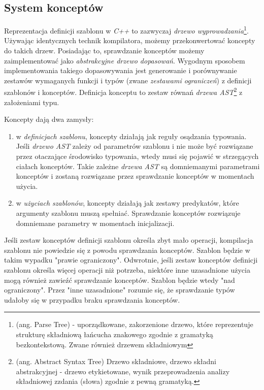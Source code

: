 \documentclass[11pt, a4paper]{article}
\begin{document}
\lstset{language=C++}

\subsection{System konceptów}

Reprezentacja definicji szablonu w \emph{C++} to zazwyczaj \emph{drzewo wyprowadzania}\footnote{(ang. Parse Tree) - uporządkowane, zakorzenione drzewo, które reprezentuje strukturę składniową łańcucha znakowego zgodnie z gramatyką bezkontekstową. Zwane również drzewem składniowym}. Używając identycznych technik kompilatora, możemy przekonwertować koncepty do takich drzew. Posiadając to, sprawdzanie konceptów możemy zaimplementować jako \emph{abstrakcyjne drzewo dopasowań}. Wygodnym sposobem implementowania takiego dopasowywania jest generowanie i porównywanie zestawów wymaganych funkcji i typów (zwane \emph{zestawami ograniczeń}) z definicji szablonów i konceptów. Definicja konceptu to zestaw równań \emph{drzewa AST}\footnote{(ang. Abstract Syntax Tree) Drzewo składniowe, drzewo składni abstrakcyjnej - drzewo etykietowane, wynik przeprowadzenia analizy składniowej zzdania (słowa) zgodnie z pewną gramatyką.} z założeniami typu. \newline

\noindent Koncepty dają dwa zamysły:

\begin{enumerate}

\item w \emph{definicjach szablonu}, koncepty działają jak reguły osądzania typowania. Jeśli \emph{drzewo AST} zależy od parametrów szablonu i nie może być rozwiązane przez otaczające środowisko typowania, wtedy musi się pojawić w strzegących ciałach konceptów. Takie zależne \emph{drzewa AST} są domniemanymi parametrami konceptów i zostaną rozwiązane przez sprawdzanie konceptów w momentach użycia.

\item w \emph{użyciach szablonów}, koncepty działają jak zestawy predykatów, które argumenty szablonu muszą spełniać. Sprawdzanie konceptów rozwiązuje domniemane parametry w momentach inicjalizacji.

\end{enumerate}

Jeśli zestaw konceptów definicji szablonu określa zbyt mało operacji, kompilacja szablonu nie powiedzie się z powodu sprawdzania konceptów. Szablon będzie w takim wypadku "prawie ograniczony". Odwrotnie, jeśli zestaw konceptów definicji szablonu określa więcej operacji niż potrzeba, niektóre inne uzasadnione użycia mogą również zawieźć sprawdzanie konceptów. Szablon będzie wtedy "nad ograniczony". Przez "inne uzasadnione" rozumie się, że sprawdzanie typów udałoby się w przypadku braku sprawdzania konceptów.
\end{document}
